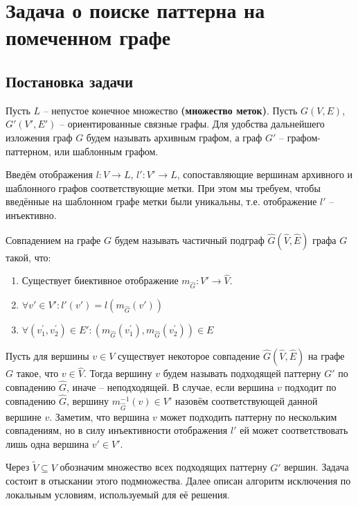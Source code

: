 \section{Задача о поиске паттерна на помеченном графе}

\subsection{Постановка задачи}
\par Пусть $L$ -- непустое конечное множество \textbf{(множество меток)}. Пусть $G(V, E)$, $G'(V', E')$ -- ориентированные связные графы. Для удобства дальнейшего изложения граф $G$ будем называть архивным графом, а граф $G'$ -- графом-паттерном, или шаблонным графом.

Введём отображения $l : V \to L$, $l' : V' \to L$, сопоставляющие вершинам архивного и шаблонного графов соответствующие метки. При этом мы требуем, чтобы введённые на шаблонном графе метки были уникальны, т.е. отображение $l'$ -- инъективно.

\begin{defn}
	Совпадением на графе $G$ будем называть частичный подграф $\widehat{G}(\widehat{V}, \widehat{E})$ графа $G$ такой, что:
	\begin{enumerate}
		\item Существует биективное отображение $m_{\widehat{G}}: V' \to \widehat{V}$.
		\item $\forall v' \in V': l'(v') = l(m_{\widehat{G}}(v'))$
		\item $\forall (v^{\prime}_1, v^{\prime}_2) \in E': (m_{\widehat{G}}(v^{\prime}_1), m_{\widehat{G}}(v^{\prime}_2)) \in E$
	\end{enumerate}
\end{defn} 

Пусть для вершины $v \in V$ существует некоторое совпадение  $\widehat{G}(\widehat{V}, \widehat{E})$ на графе $G$ такое, что $v \in \widehat{V}$. Тогда вершину $v$ будем называть подходящей паттерну $G'$ по совпадению $\widehat{G}$, иначе -- неподходящей. В случае, если вершина $v$ подходит по совпадению $\widehat{G}$, вершину $m_{\widehat{G}}^{-1}(v) \in  V'$ назовём соответствующей данной вершине $v$. Заметим, что вершина $v$ может подходить паттерну по нескольким совпадениям, но в силу инъективности отображения $l'$ ей может соответствовать лишь одна вершина $v' \in  V'$.

Через $\widetilde{V} \subseteq V$ обозначим множество всех подходящих паттерну $G'$ вершин. Задача состоит в отыскании этого подмножества. Далее описан алгоритм исключения по локальным условиям, используемый для её решения.

